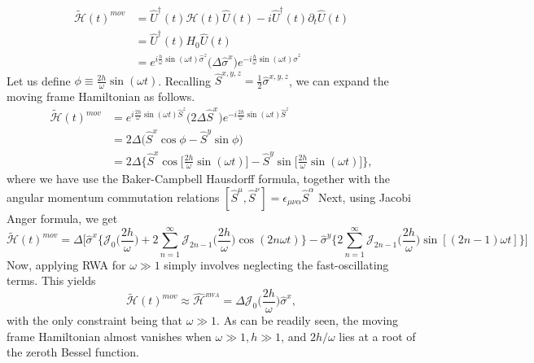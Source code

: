 \documentclass[aps,prb,reprint,showpacs,floatfix,superscriptaddress, onecolumn, 9pt]{revtex4-2}
\begin{document}
\begin{enumerate}
{\begin{align}
    \tilde{\mathcal{H}}(t)^{mov} &=\hat{U}^\dagger(t) \mathcal{H}(t) \hat{U}(t) - i \hat{U}^\dagger(t) \partial_t \hat{U}(t)\nonumber\\
    &= \hat{U}^\dagger(t) H_0 \hat{U}(t)\nonumber\\
    &= e^{i \frac{h}{\omega} \sin(\omega t)\hat{\sigma}^z} \Big(\Delta \hat{\sigma}^x\Big) e^{-i \frac{h}{\omega} \sin(\omega t)\hat{\sigma}^z}
    \end{align}
    Let us define $\phi \equiv \frac{2h}{\omega} \sin(\omega t)$. Recalling $\hat{S}^{x,y,z} = \frac12 \hat{\sigma}^{x,y,z}$, we can expand the moving frame Hamiltonian as follows.
    \begin{align}
    \tilde{\mathcal{H}}(t)^{mov} &= e^{i \frac{2h}{\omega} \sin(\omega t)\hat{S}^z} \Big(2\Delta \hat{S}^x\Big) e^{-i \frac{2h}{\omega} \sin(\omega t)\hat{S}^z}\nonumber\\
    &= 2\Delta \Big(\hat{S}^x \cos{\phi} - \hat{S}^y \sin{\phi}\Big)\nonumber\\
    &= 2\Delta \bigg\{\hat{S}^x\cos\Big[\frac{2h}{\omega}\sin(\omega t)\Big] - \hat{S}^y\sin\Big[\frac{2h}{\omega}\sin(\omega t)\Big]\bigg\},
    \end{align}
    where we have use the Baker-Campbell Hausdorff formula, together with the angular momentum commutation relations $[\hat{S}^\mu, \hat{S}^\nu]=\epsilon_{\mu\nu\alpha}\hat{S}^\alpha$
    Next, using Jacobi Anger formula, we get
    \begin{equation}
    \tilde{\mathcal{H}}(t)^{mov} = \Delta \Bigg[\hat{\sigma}^x \bigg\{\mathcal{J}_0\Big(\frac{2h}{\omega}\Big) + 2 \sum_{n=1}^{\infty} \mathcal{J}_{2n-1}\Big(\frac{2h}{\omega}\Big)\cos(2n\omega t)\bigg\} -\hat{\sigma}^y\bigg\{2\sum_{n=1}^{\infty} \mathcal{J}_{2n-1}\Big(\frac{2h}{\omega}\Big) \sin\left[(2n-1)\omega t\right]\bigg\}\Bigg]
    \label{eq:hexact}
    \end{equation}
    Now, applying RWA for $\omega \gg 1$ simply involves neglecting the fast-oscillating terms. This yields
    \begin{equation}
    \tilde{\mathcal{H}}(t)^{mov}\approx\hat{\mathcal{H}}^{_{RWA}} = \Delta \mathcal{J}_0 \Big(\frac{2h}{\omega}\Big) \hat{\sigma}^x,
    \end{equation}
with the only constraint being that $\omega \gg 1$. As can be readily seen, the moving frame Hamiltonian almost vanishes when $\omega\gg 1, h\gg 1$, and $2h/\omega$ lies at a root of the zeroth Bessel function.

}
\end{enumerate}
\end{document}
